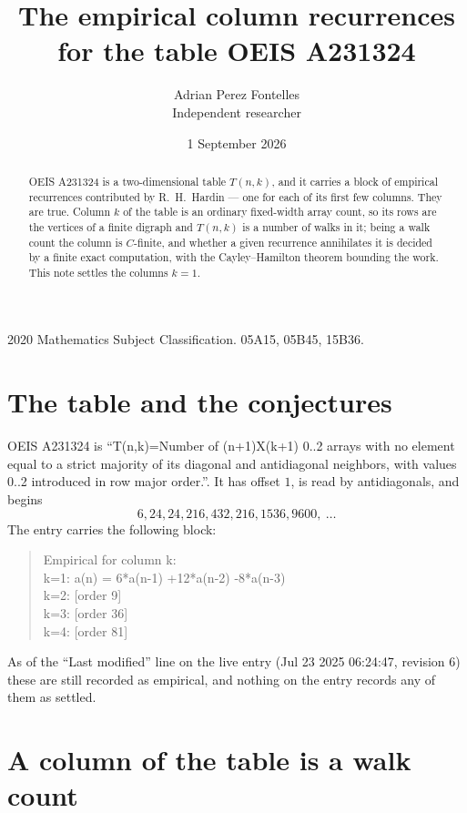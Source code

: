 \documentclass[11pt,a4paper]{article}
\title{The empirical column recurrences for the table OEIS A231324}
\author{Adrian Perez Fontelles\\ \small Independent researcher}
\date{1 September 2026}
\theoremstyle{plain}
\theoremstyle{definition}
\begin{document}
\maketitle

\begin{abstract}
OEIS A231324 is a two-dimensional table $T(n,k)$, and it carries a block of empirical
recurrences contributed by R.~H.~Hardin --- one for each of its first few columns. They are
true. Column $k$ of the table is an ordinary fixed-width array count, so its rows are the
vertices of a finite digraph and $T(n,k)$ is a number of walks in it; being a walk count the
column is $C$-finite, and whether a given recurrence annihilates it is decided by a finite
exact computation, with the Cayley--Hamilton theorem bounding the work. This note settles the columns $k=1$.
\end{abstract}

\noindent\small 2020 Mathematics Subject Classification. 05A15, 05B45, 15B36.\normalsize

\section{The table and the conjectures}

OEIS A231324 is ``T(n,k)=Number of (n+1)X(k+1) 0..2 arrays with no element equal to a strict majority of its diagonal and antidiagonal neighbors, with values 0..2 introduced in row major order.''. It has offset $1$, is
read by antidiagonals, and begins
\[
6, 24, 24, 216, 432, 216, 1536, 9600,\ \dots
\]
The entry carries the following block:
\begin{quote}\small
Empirical for column k:\\
k=1: a(n) = 6*a(n-1) +12*a(n-2) -8*a(n-3)\\
k=2: [order 9]\\
k=3: [order 36]\\
k=4: [order 81]\\
\end{quote}
As of the ``Last modified'' line on the live entry (Jul 23 2025 06:24:47, revision 6) these are still
recorded as empirical, and nothing on the entry records any of them as settled.

\section{A column of the table is a walk count}
\end{document}
